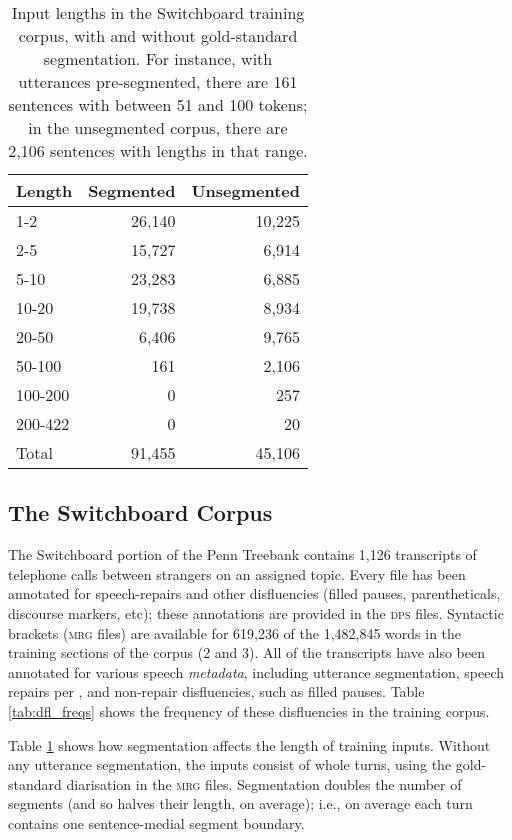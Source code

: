 \documentclass[11pt,letterpaper]{article}
\begin{document}
\begin{table}
\centering
\small
\begin{tabular}{l|rr}
    \hline
    Length & Segmented & Unsegmented \\
    \hline \hline
    1-2 & 26,140 & 10,225 \\
    2-5 & 15,727 & 6,914 \\
    5-10 & 23,283 & 6,885 \\
    10-20 & 19,738 &  8,934 \\
    20-50 & 6,406 & 9,765 \\
    50-100 & 161 & 2,106 \\
    100-200 & 0 & 257 \\
    200-422 & 0 & 20 \\
    \hline
    Total & 91,455 & 45,106 \\
    \hline
\end{tabular}
\caption{\small Input lengths in the Switchboard training corpus, with and without
    gold-standard segmentation.  For instance, with utterances pre-segmented,
    there are 161 sentences with between 51 and 100 tokens; in the unsegmented
corpus, there are 2,106 sentences with lengths in that range.
\label{tab:seg_freqs}}
\vspace*{-2em}
\end{table}

\newpage
\subsection{The Switchboard Corpus}
\label{sec:swbd}

The Switchboard portion of the Penn Treebank \citep{marcus:93} contains 1,126
transcripts of telephone calls between strangers on an assigned topic.
Every file has been annotated for speech-repairs and other disfluencies (filled
pauses, parentheticals, discourse markers, etc); these annotations are provided
in the \textsc{dps} files.  Syntactic brackets (\textsc{mrg} files) are available
for 619,236 of the 1,482,845 words in the training sections of the corpus (2 and 3). 
All of the transcripts have also been annotated for various speech \emph{metadata},
including utterance segmentation, speech repairs per \citet{shriberg:94}, and 
non-repair disfluencies, such as filled pauses.  Table \ref{tab:dfl_freqs} shows the
frequency of these disfluencies in the training corpus.

Table \ref{tab:seg_freqs} shows how segmentation affects the length of training
inputs.  Without any utterance segmentation, the inputs consist of whole turns,
using the gold-standard diarisation in the \textsc{mrg} files.
Segmentation doubles the number of segments (and so halves their length, on average);
i.e., on average each turn contains one sentence-medial segment boundary.
\end{document}
